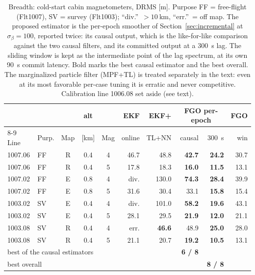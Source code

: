 \documentclass{IEEEtaes}
\begin{document}
\begin{table}[t]
\caption{Breadth: cold-start cabin magnetometers, DRMS [m]. Purpose FF = free-flight
(Flt1007), SV = survey (Flt1003); ``div.''\ $>\SI{10}{\kilo\meter}$, ``err.''\ = off
map. The proposed estimator is the per-epoch smoother of
Section~\ref{sec:incremental} at $\sigma_{\beta}=100$, reported twice: its causal
output, which is the like-for-like comparison against the two causal filters, and
its committed output at a \SI{300}{\second} lag. The sliding window is kept as the
intermediate point of the lag spectrum, at its own \SI{90}{\second} commit
latency. Bold marks the best causal estimator and the best overall. The
marginalized particle filter (MPF+TL) is treated separately in the text: even at
its most favorable per-case tuning it is erratic and never competitive.
Calibration line 1006.08 set aside (see text).}
\label{tab:breadth}
\centering
\setlength{\tabcolsep}{3pt}
\begin{tabular}{llccc rr rr r}
\toprule
 & & & alt & & EKF & EKF+ & \multicolumn{2}{c}{FGO per-epoch} & FGO \\
\cmidrule(lr){8-9}
Line & Purp. & Map & [km] & Mag & online & TL+NN & causal & \SI{300}{\second} & win \\
\midrule
1007.06 & FF & R & 0.4 & 4 & 46.7 & 48.8 & \textbf{42.7} & \textbf{24.2} & 30.7 \\
1007.06 & FF & R & 0.4 & 5 & 17.8 & 18.3 & \textbf{16.0} & \textbf{11.5} & 13.1 \\
1007.02 & FF & E & 0.8 & 4 & div. & 130.0 & \textbf{74.3} & \textbf{28.4} & 39.9 \\
1007.02 & FF & E & 0.8 & 5 & 31.6 & 30.4 & 33.1 & \textbf{15.8} & 15.4 \\
1003.02 & SV & E & 0.4 & 4 & div. & 101.0 & \textbf{58.2} & \textbf{19.6} & 43.1 \\
1003.02 & SV & E & 0.4 & 5 & 28.1 & 29.5 & \textbf{21.9} & \textbf{12.0} & 21.1 \\
1003.08 & SV & R & 0.4 & 4 & err. & \textbf{46.6} & 48.9 & \textbf{25.0} & 28.0 \\
1003.08 & SV & R & 0.4 & 5 & 21.1 & 20.7 & \textbf{19.2} & \textbf{10.5} & 13.1 \\
\midrule
\multicolumn{5}{l}{best of the causal estimators} & & & \textbf{6 / 8} & & \\
\multicolumn{5}{l}{best overall} & & & & \textbf{8 / 8} & \\
\bottomrule
\end{tabular}
\end{table}
\end{document}
